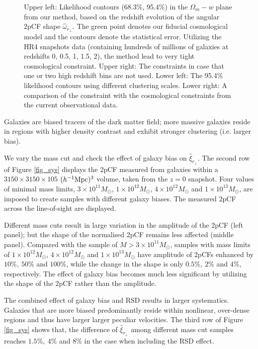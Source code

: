 \documentclass[iop]{emulateapj}
\begin{document}
\begin{figure}
{   }
   \caption{\label{fig_contours}
   Upper left: Likelihood contours (68.3\%, 95.4\%) in the $\Omega_m-w$ plane from our method, 
   based on the redshift evolution of the angular 2pCF shape $\hat\omega_{r_\perp}$.
   The green point denotes our fiducial cosmological model and the contours denote the statistical error.
   Utilizing the HR4 snapshots data (containing hundreds of millions of galaxies at redshifts 0, 0.5, 1, 1.5, 2),
   the method lead to very tight cosmological constraint.
   Upper right: The constraints in case that one or two high redshift bins are not used.
   Lower left: The 95.4\% likelihood contours using different clustering scales.
   Lower right: A comparison of the constraint with the cosmological constraints from the current observational data.
   }
\end{figure}

Galaxies are biased tracers of the dark matter field;
more massive galaxies reside in regions with higher density contrast
and exhibit stronger clustering (i.e. larger bias).

We vary the mass cut and check the effect of galaxy bias on $\hat \xi_{r_\perp}$.
The second row of Figure \ref{fig_sys} displays the 2pCF measured from galaxies within a $3150\times3150\times105$ $(h^{-1}\rm Mpc)^3$ volume, taken from the $z=0$ snapshot.
Four values of minimal mass limits, $3\times 10^{11} M_{\odot}$, $1\times 10^{12} M_{\odot}$, $4\times 10^{12} M_{\odot}$ and $1\times 10^{13} M_{\odot}$,
are imposed to create samples with different galaxy biases.
The measured 2pCF across the line-of-sight are displayed.

Different mass cuts result in large variation in the amplitude of the 2pCF (left panel);
but the shape of the normalised 2pCF remains less affected (middle panel).
Compared with the sample of $M>3\times 10^{11} M_{\odot}$,
samples with mass limits of $1\times 10^{12} M_{\odot}$, $4\times 10^{12} M_{\odot}$ and $1\times 10^{13} M_{\odot}$
have amplitude of 2pCFs enhanced by $10\%,\ 50\%$ and $100\%$, 
while the change in the shape is only $0.5\%,\ 2\%$ and $4\%$, respectively.
The effect of galaxy bias becomes much less significant by utilizing the shape of the 2pCF rather than the amplitude.

The combined effect of galaxy bias and RSD results in larger systematics.
Galaxies that are more biased predominantly reside within nonlinear, over-dense regions and thus have larger larger peculiar velocities.
The third row of Figure \ref{fig_sys} shows that, 
the difference of $\hat \xi_{r_\perp}$ among different mass cut samples reaches $1.5\%,\ 4\%$ and $8\%$ in the case when including the RSD effect.
\end{document}

